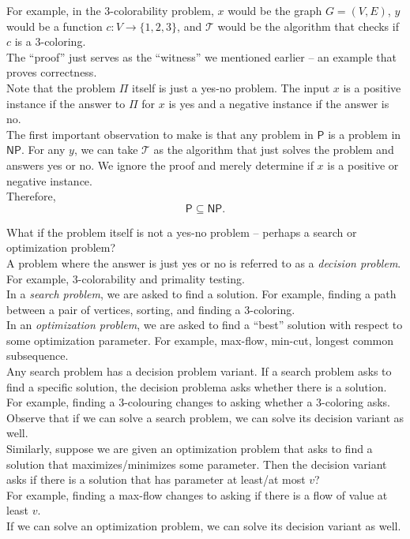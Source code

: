 	For example, in the $3$-colorability problem, $x$ would be the graph $G=(V,E)$, $y$ would be a function $c:V\to\{1,2,3\}$, and $\mathcal{T}$ would be the algorithm that checks if $c$ is a $3$-coloring.\\
	The ``proof'' just serves as the ``witness'' we mentioned earlier -- an example that proves correctness.\\

	Note that the problem $\Pi$ itself is just a yes-no problem. The input $x$ is a positive instance if the answer to $\Pi$ for $x$ is yes and a negative instance if the answer is no.\\

	The first important observation to make is that any problem in $\mathsf{P}$ is a problem in $\mathsf{NP}$. For any $y$, we can take $\mathcal{T}$ as the algorithm that just solves the problem and answers yes or no. We ignore the proof and merely determine if $x$ is a positive or negative instance.\\
	Therefore,
	\[ \mathsf{P} \subseteq \mathsf{NP}. \]

	What if the problem itself is not a yes-no problem -- perhaps a search or optimization problem?\\
	A problem where the answer is just yes or no is referred to as a \textit{decision problem}. For example, $3$-colorability and primality testing.\\
	In a \textit{search problem}, we are asked to find a solution. For example, finding a path between a pair of vertices, sorting, and finding a $3$-coloring.\\
	In an \textit{optimization problem}, we are asked to find a ``best'' solution with respect to some optimization parameter. For example, max-flow, min-cut, longest common subsequence.\\

	Any search problem has a decision problem variant. If a search problem asks to find a specific solution, the decision problema asks whether there is a solution.\\
	For example, finding a $3$-colouring changes to asking whether a $3$-coloring asks.\\
	Observe that if we can solve a search problem, we can solve its decision variant as well.\\

	Similarly, suppose we are given an optimization problem that asks to find a solution that maximizes/minimizes some parameter. Then the decision variant asks if there is a solution that has parameter at least/at most $v$?\\
	For example, finding a max-flow changes to asking if there is a flow of value at least $v$.\\
	If we can solve an optimization problem, we can solve its decision variant as well.\\

